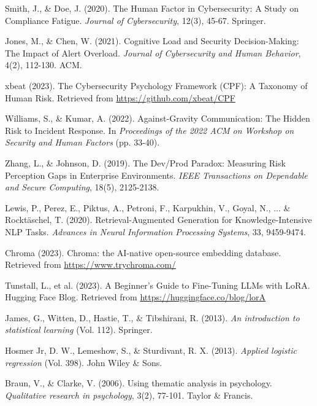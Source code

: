 \documentclass[11pt, a4paper]{article}
\begin{document}
\begin{thebibliography}{99}

Smith, J., \& Doe, J. (2020). The Human Factor in Cybersecurity: A Study on Compliance Fatigue. \textit{Journal of Cybersecurity}, 12(3), 45-67. Springer.

Jones, M., \& Chen, W. (2021). Cognitive Load and Security Decision-Making: The Impact of Alert Overload. \textit{Journal of Cybersecurity and Human Behavior}, 4(2), 112-130. ACM.

xbeat (2023). The Cybersecurity Psychology Framework (CPF): A Taxonomy of Human Risk. Retrieved from \url{https://github.com/xbeat/CPF}

Williams, S., \& Kumar, A. (2022). Against-Gravity Communication: The Hidden Risk to Incident Response. In \textit{Proceedings of the 2022 ACM on Workshop on Security and Human Factors} (pp. 33-40).

Zhang, L., \& Johnson, D. (2019). The Dev/Prod Paradox: Measuring Risk Perception Gaps in Enterprise Environments. \textit{IEEE Transactions on Dependable and Secure Computing}, 18(5), 2125-2138.

Lewis, P., Perez, E., Piktus, A., Petroni, F., Karpukhin, V., Goyal, N., ... \& Rocktäschel, T. (2020). Retrieval-Augmented Generation for Knowledge-Intensive NLP Tasks. \textit{Advances in Neural Information Processing Systems}, 33, 9459-9474.

Chroma (2023). Chroma: the AI-native open-source embedding database. Retrieved from \url{https://www.trychroma.com/}

Tunstall, L., et al. (2023). A Beginner's Guide to Fine-Tuning LLMs with LoRA. Hugging Face Blog. Retrieved from \url{https://huggingface.co/blog/lorA}

James, G., Witten, D., Hastie, T., \& Tibshirani, R. (2013). \textit{An introduction to statistical learning} (Vol. 112). Springer.

Hosmer Jr, D. W., Lemeshow, S., \& Sturdivant, R. X. (2013). \textit{Applied logistic regression} (Vol. 398). John Wiley \& Sons.

Braun, V., \& Clarke, V. (2006). Using thematic analysis in psychology. \textit{Qualitative research in psychology}, 3(2), 77-101. Taylor \& Francis.


\end{thebibliography}
\end{document}

